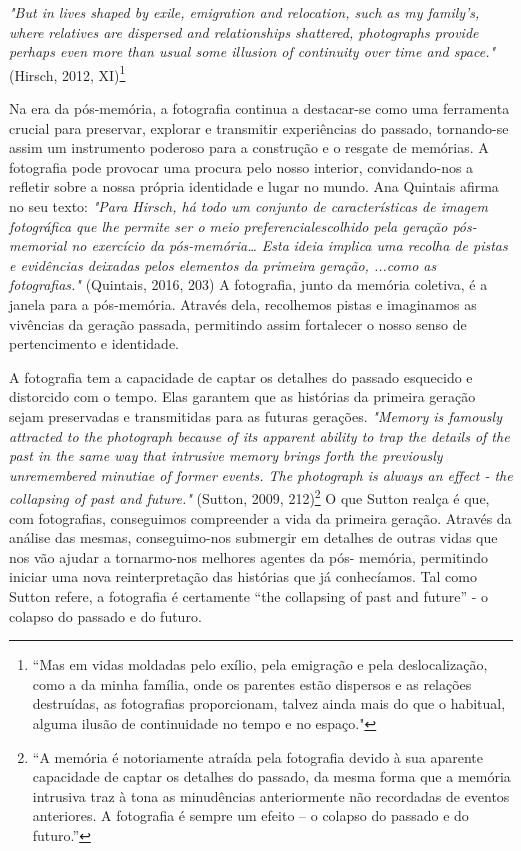 \documentclass{article}
\begin{document}
 
 



\textit{"But in lives shaped by exile, emigration and relocation, such as my family's, where }
\textit{relatives are dispersed and relationships shattered, photographs provide perhaps even }
\textit{more than usual some illusion of continuity over time and space."} (Hirsch, 2012, XI)\footnote{“Mas em vidas moldadas pelo exílio, pela emigração e pela deslocalização, como a da minha família, onde os parentes estão dispersos e as relações destruídas, as fotografias proporcionam, talvez ainda mais do que o habitual, alguma ilusão de continuidade no tempo e no espaço." } 
 
Na era da pós-memória, a fotografia continua a destacar-se como uma ferramenta 
crucial para preservar, explorar e transmitir experiências do passado, tornando-se assim 
um instrumento poderoso para a construção e o resgate de memórias. A fotografia pode 
provocar uma procura pelo nosso interior, convidando-nos a refletir sobre a nossa própria 
identidade e lugar no mundo. Ana Quintais afirma no seu texto: \textit{"Para Hirsch, há todo }
\textit{um  conjunto  de  características  de  imagem  fotográfica  que  lhe  permite  ser  o  meio }
\textit{preferencialescolhido pela geração pós-memorial no exercício da pós-memória… Esta }
\textit{ideia implica uma recolha de pistas e evidências deixadas pelos elementos da primeira }
\textit{geração, ...como as fotografias."} (Quintais, 2016, 203) A fotografia, junto da memória 
coletiva, é a janela para a pós-memória. Através dela, recolhemos pistas e imaginamos as 
vivências da geração passada, permitindo assim fortalecer o nosso senso de pertencimento 
e identidade. 
 
A  fotografia  tem  a  capacidade  de  captar  os  detalhes  do  passado  esquecido  e 
distorcido  com  o  tempo.  Elas  garantem  que  as  histórias  da  primeira  geração  sejam 
preservadas e transmitidas para as futuras gerações. \textit{"Memory is famously attracted to the }
\textit{photograph because of its apparent ability to trap the details of the past in the same way }
\textit{that  intrusive  memory  brings  forth  the  previously  unremembered  minutiae  of  former }
\textit{events. The photograph is always an effect - the collapsing of past and future."} (Sutton, 
2009, 212)\footnote{“A memória é notoriamente atraída pela fotografia devido à sua aparente capacidade de captar os detalhes do passado, da mesma forma que a memória intrusiva traz à tona as minudências anteriormente não recordadas de eventos anteriores. A fotografia é sempre um efeito – o colapso do passado e do futuro.” } O que Sutton realça é que, com fotografias, conseguimos compreender a 
vida da primeira geração. Através da análise das mesmas, conseguimo-nos submergir em 
detalhes  de  outras  vidas  que  nos  vão  ajudar  a  tornarmo-nos  melhores  agentes  da  pós-
memória, permitindo iniciar uma nova reinterpretação das histórias que já conhecíamos. 
Tal como Sutton refere, a fotografia é certamente “the collapsing of past and future” - o 
colapso do passado e do futuro. 
\end{document}
